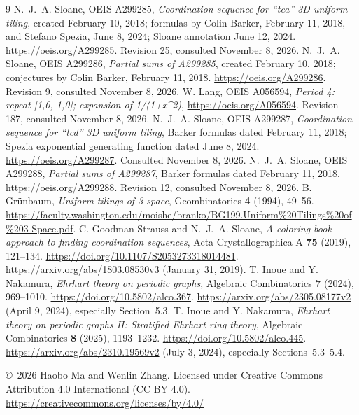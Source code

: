 \documentclass[11pt]{article}
\begin{document}
\begin{thebibliography}{9}
 N.~J.~A. Sloane, OEIS A299285,
\emph{Coordination sequence for ``tea'' 3D uniform tiling}, created
February 10, 2018; formulas by Colin Barker, February 11, 2018, and
Stefano Spezia, June 8, 2024; Sloane annotation June 12, 2024.
\url{https://oeis.org/A299285}. Revision 25, consulted November 8, 2026.
 N.~J.~A. Sloane, OEIS A299286,
\emph{Partial sums of A299285}, created February 10, 2018;
conjectures by Colin Barker, February 11, 2018.
\url{https://oeis.org/A299286}. Revision 9, consulted November 8, 2026.
 W. Lang, OEIS A056594,
\emph{Period 4: repeat [1,0,-1,0]; expansion of 1/(1+x\textasciicircum 2)},
\url{https://oeis.org/A056594}. Revision 187, consulted November 8, 2026.
 N.~J.~A. Sloane, OEIS A299287,
\emph{Coordination sequence for ``tcd'' 3D uniform tiling},
Barker formulas dated February 11, 2018; Spezia exponential generating function
dated June 8, 2024. \url{https://oeis.org/A299287}. Consulted November 8, 2026.
 N.~J.~A. Sloane, OEIS A299288,
\emph{Partial sums of A299287}, Barker formulas dated February 11, 2018.
\url{https://oeis.org/A299288}. Revision 12, consulted November 8, 2026.
 B. Gr\"unbaum, \emph{Uniform tilings of 3-space},
Geombinatorics \textbf{4} (1994), 49--56.
\url{https://faculty.washington.edu/moishe/branko/BG199.Uniform\%20Tilings\%20of\%203-Space.pdf}.
 C. Goodman-Strauss and N.~J.~A. Sloane,
\emph{A coloring-book approach to finding coordination sequences},
Acta Crystallographica A \textbf{75} (2019), 121--134.
\url{https://doi.org/10.1107/S2053273318014481}.
\url{https://arxiv.org/abs/1803.08530v3} (January 31, 2019).
 T. Inoue and Y. Nakamura,
\emph{Ehrhart theory on periodic graphs},
Algebraic Combinatorics \textbf{7} (2024), 969--1010.
\url{https://doi.org/10.5802/alco.367}.
\url{https://arxiv.org/abs/2305.08177v2} (April 9, 2024),
especially Section~5.3.
 T. Inoue and Y. Nakamura,
\emph{Ehrhart theory on periodic graphs II: Stratified Ehrhart ring theory},
Algebraic Combinatorics \textbf{8} (2025), 1193--1232.
\url{https://doi.org/10.5802/alco.445}.
\url{https://arxiv.org/abs/2310.19569v2} (July 3, 2024),
especially Sections~5.3--5.4.
\end{thebibliography}
\noindent\small\copyright\ 2026 Haobo Ma and Wenlin Zhang.
Licensed under Creative Commons Attribution 4.0 International (CC BY 4.0).
\url{https://creativecommons.org/licenses/by/4.0/}
\end{document}
